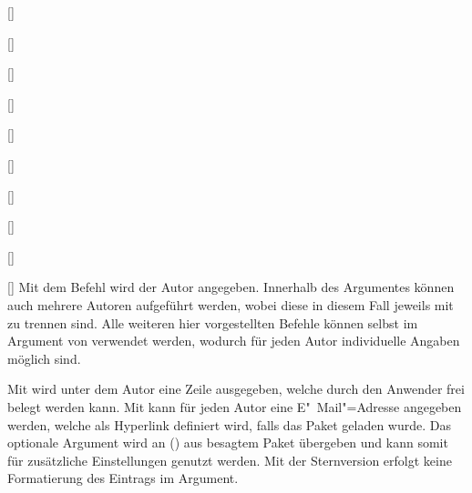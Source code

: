 \begin{Declaration*}{}
\begin{Declaration*}{}
\begin{Declaration*}{}
\begin{Declaration}{[]}
\begin{Declaration}{[]}
\begin{Declaration}{%
  []%
}
\begin{Declaration}{[]}
\begin{Declaration}{[]}
\begin{Declaration}{[]}
\begin{Declaration}{[]}
\begin{Declaration}{[]}
\begin{Declaration}{[]}
\begin{Declaration}{[]}
\printdeclarationlist%
%
%
%
%
Mit dem Befehl  wird der Autor angegeben. Innerhalb des 
Argumentes können auch mehrere Autoren aufgeführt werden, wobei diese in diesem 
Fall jeweils mit  zu trennen sind. Alle weiteren hier vorgestellten 
Befehle können selbst im Argument von  verwendet werden, wodurch 
für jeden Autor individuelle Angaben möglich sind.

Mit  wird unter dem Autor eine Zeile ausgegeben, welche 
durch den Anwender frei belegt werden kann. Mit  kann für 
jeden Autor eine E"~Mail"=Adresse angegeben werden, welche als Hyperlink
definiert wird, falls das Paket  geladen wurde. Das optionale 
Argument wird an () aus besagtem Paket 
übergeben und kann somit für zusätzliche Einstellungen genutzt werden. Mit der 
Sternversion  erfolgt keine Formatierung des Eintrags im 
Argument.


\end{Declaration}
\end{Declaration}
\end{Declaration}
\end{Declaration}
\end{Declaration}
\end{Declaration}
\end{Declaration}
\end{Declaration}
\end{Declaration}
\end{Declaration}
\end{Declaration*}
\end{Declaration*}
\end{Declaration*}
